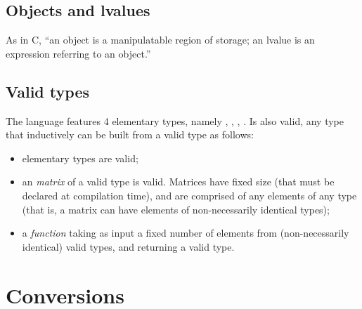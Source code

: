 \subsection{Objects and lvalues}
As in C, ``an object is a manipulatable region of storage; an lvalue is an expression referring to an object.''

\subsection{Valid types}

The language features 4 elementary types, namely \integ, \float, \complex, \mat. Is also valid, any type that inductively can be built from a valid type as follows:
\begin{itemize}
  \item elementary types are valid;
  \item an \emph{matrix} of a valid type is valid. Matrices have fixed size (that must be declared at compilation time), and are comprised of any elements of any type (that is, a matrix can have elements of non-necessarily identical types);
  \item a \emph{function} taking as input a fixed number of elements from (non-necessarily identical) valid types, and returning a valid type.
\end{itemize}

\section{Conversions}

